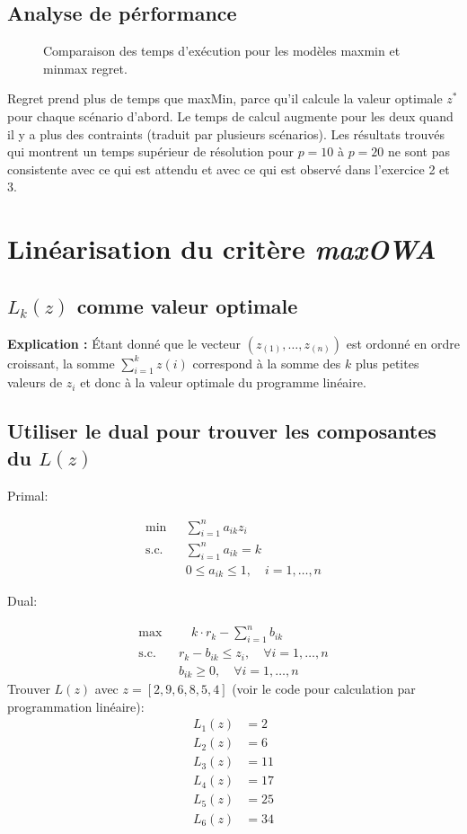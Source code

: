 \documentclass[10pt,a4paper]{report}
\begin{document}
\section{Analyse de pérformance}
\begin{figure}[h!]
    \centering
      
    \caption{Comparaison des temps d'exécution pour les modèles maxmin et minmax regret.}
    \label{fig:performance_ex1}
\end{figure}
Regret prend plus de temps que maxMin, parce qu'il calcule la valeur optimale $z^*$ pour chaque scénario d'abord. Le temps de calcul augmente pour les deux quand il y a plus des contraints (traduit par plusieurs scénarios). Les résultats trouvés qui montrent un temps supérieur de résolution pour $p=10$ à $p=20$ ne sont pas consistente avec ce qui est attendu et avec ce qui est observé dans l'exercice 2 et 3.
\chapter{Linéarisation du critère \textit{maxOWA}}
\section{$L_k(z)$ comme valeur optimale}
\textbf{Explication :} Étant donné que le vecteur $(z_{(1)}, \ldots, z_{(n)})$ est ordonné en ordre croissant, la somme $\sum_{i=1}^{k} z(i)$ correspond à la somme des $k$ plus petites valeurs de $z_i$ et donc à la valeur optimale du programme linéaire.
\section{Utiliser le dual pour trouver les composantes du $L(z)$ }
Primal:

\begin{align*}
\min & \sum_{i=1}^{n} a_{ik} z_i \\
\text{s.c.} \quad & \sum_{i=1}^{n} a_{ik} = k \\
& 0 \leq a_{ik} \leq 1, \quad i = 1, \dots, n
\end{align*}

Dual:

\begin{align*}
\max & \quad k \cdot r_k - \sum_{i=1}^{n} b_{ik} \\
\text{s.c.} \quad & r_k - b_{ik} \leq z_i, \quad \forall i = 1, \dots, n \\
& b_{ik} \geq 0, \quad \forall i = 1, \dots, n
\end{align*}
Trouver $L(z)$ avec $z=[2,9,6,8,5,4]$ (voir le code pour calculation par programmation linéaire):
\begin{align*}
L_1(z)&= 2\\
L_2(z)&= 6\\
L_3(z)&= 11\\
L_4(z)&= 17\\
L_5(z)&= 25\\
L_6(z)&= 34\\
\end{align*}
\end{document}
